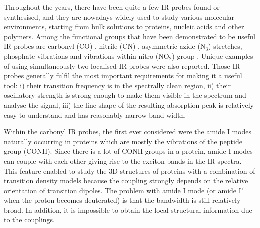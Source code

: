 \documentclass[a4paper,titlepage,twoside,fleqn,12pt]{book}
\begin{document}
\begin{refsection}
Throughout the years, there have been quite a few IR probes found or synthesised, and
they are nowadays widely used to study various molecular environments, starting from bulk solutions
to proteins, nucleic acids and other polymers. \citep{Kim.Cho.ChemRev.2013,
Ma.Pazos.Zhang.Culik.Gai.AnnuRevPhysChem.2015,Waegele.Culik.Gai.JCPL.2011}
Among the functional groups that have been demonstrated to be useful IR probes
are carbonyl (CO) \citep{Fried.Bagchi.Boxer.Science.2014,Thielges.Axup.Wong.Lee.Chung.Schultz.Fayer.JPCB.2011}, 
nitrile (CN) \citep{Zhang.Markiewicz.Doerksen.Smith.Gai.PCCP.2015,Johnson.Londergan.Charkoudian.JACS.2014,
Waegele.Culik.Gai.JCPL.2011,Stafford.Ensign.Webb.JPCB.2010,
Silverman.Pitzer.Ankomah.Boxer.Fenlon.JPCB.2007,Suydam.Snow.Pande.Boxer.Science.2006},
asymmetric azide (N$_3$) \citep{Thielges.Axup.Wong.Lee.Chung.Schultz.Fayer.JPCB.2011,
Ye.Zaitseva.Caltabiano.Schertler.Sakmar.Deupi.Vogel.Nature.2010,Waegele.Culik.Gai.JCPL.2011,
Taskent-Sezgin.Chung.Banerjee.Nagarajan.Dyer.Carrico.Raleigh.AngewChemInt.2010,Oh.Lee.Joo.Han.Cho.JPCB.2008} 
stretches, phosphate vibrations \citep{Levinson.Bolte.Miller.Corcelli.Boxer.JACS.2011}
and vibrations within nitro (NO$_2$) group \citep{Smith.Linderman.Luskin.Brewer.JPCB.2011}. 
Unique examples of using simultaneously two localised IR probes
were also reported. \citep{Thielges.Axup.Wong.Lee.Chung.Schultz.Fayer.JPCB.2011}
Those IR probes
generally fulfil the most important requirements for making it a useful tool: i) their transition
frequency is in the spectrally clean region, ii) their oscillatory strength is strong enough
to make them visible in the spectrum and analyse the signal, iii) the line shape 
of the resulting absorption peak is relatively easy to understand and has reasonably
narrow band width. 

Within the carbonyl IR probes, the first ever considered were the amide I modes
naturally occurring in proteins which are mostly the vibrations of the peptide group (CONH). Since
there is a lot of CONH groups in a protein, amide I modes can couple with each other
giving rise to the exciton bands in the IR spectra. This feature enabled to study 
the 3D structures of proteins with a combination of transition density
models \citep{Hayashi.Mukamel.JPCB.2007} because the coupling strongly depends 
on the relative orientation of transition dipoles. 
The problem with amide I mode (or amide I' when the proton becomes deuterated)
is that the bandwidth is still relatively broad. In addition, it is impossible to
obtain the local structural information due to the couplings.


\end{refsection}
\end{document}
